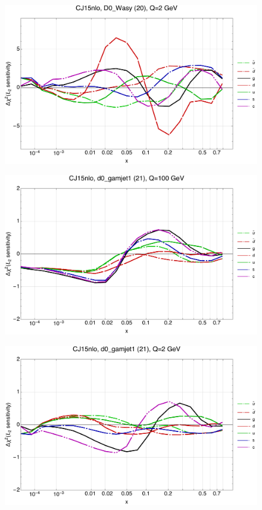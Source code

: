\documentclass[10pt,aps,prd,floatfix,titlepage]{revtex4}
\begin{document}
\begin{figure}
\includegraphics[width=\textwidth,height=0.44\textheight,keepaspectratio]{1/20_CJ15nlo_L2_q2_Sf_1.pdf}
\caption{}
\end{figure}
\clearpage
\begin{figure}
\includegraphics[width=\textwidth,height=0.44\textheight,keepaspectratio]{1/21_CJ15nlo_L2_q100_Sf_1.pdf}
\caption{}
\end{figure}
\begin{figure}
\includegraphics[width=\textwidth,height=0.44\textheight,keepaspectratio]{1/21_CJ15nlo_L2_q2_Sf_1.pdf}
\caption{}
\end{figure}
\end{document}
